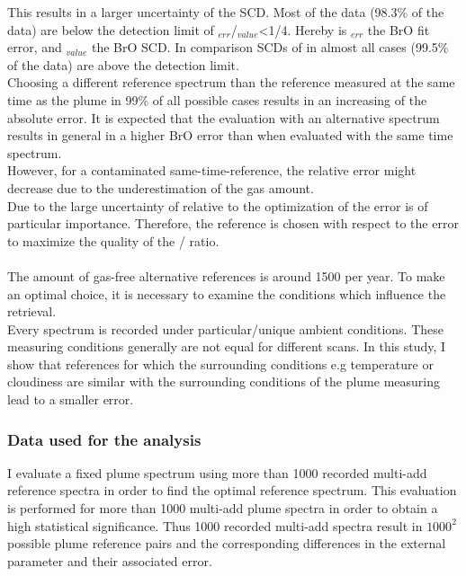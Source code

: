 %
This results in a larger uncertainty of the   SCD. Most of the  data (98.3\% of the data) are below the detection limit of $_{err}$/$_{value}$<1/4. Hereby is $_{err}$ the BrO fit error, and $_{value}$ the BrO SCD. In comparison SCDs of  in almost all cases (99.5\% of the data)  are above the detection limit. \\
%
Choosing a different reference spectrum than the reference measured at the same time as the plume in 99\% of all possible cases results in an increasing of the absolute error. 
It is expected that the evaluation with an alternative spectrum results in general in a higher BrO error than when evaluated with the same time spectrum.\\
However, for a contaminated same-time-reference, the relative error might decrease due to the underestimation of the gas amount. \\
Due to the large uncertainty of  relative to  the optimization of the  error is of particular importance. Therefore, the reference is chosen with respect to the  error to maximize the quality of the / ratio. \\
\\
The amount of gas-free alternative references is around 1500 per year. To make an optimal choice, it is necessary to examine the conditions which influence the  retrieval.\\
Every spectrum is recorded under particular/unique ambient conditions. These measuring conditions generally are not equal for different scans. In this study, I show that references for which the surrounding conditions e.g temperature or cloudiness are similar with the surrounding conditions of the  plume measuring lead to a smaller error.\\
%
\subsubsection*{Data used for the analysis}
I evaluate a fixed plume spectrum using more than 1000 recorded multi-add reference spectra in order to find the optimal reference spectrum. This evaluation is performed for more than 1000 multi-add plume spectra in order to obtain a high statistical significance. Thus 1000 recorded multi-add spectra result in $1000^2$ possible plume reference pairs and the corresponding differences in the external parameter and their associated  error. 


